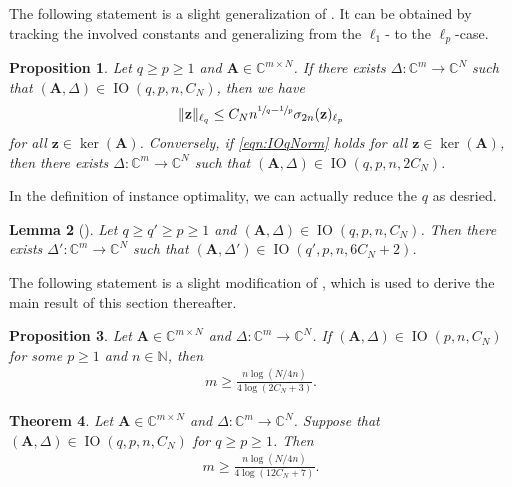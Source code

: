 \documentclass[11pt,reqno, a4paper]{article}
\numberwithin{equation}{section}
\newtheorem{theorem}{Theorem}[section]
\newtheorem{lemma}[theorem]{Lemma}
\newtheorem{prop}[theorem]{Proposition}
\newcommand{\N}{\mathbb{N}}
\newcommand{\C}{\mathbb{C}}
\begin{document}
The following statement is a slight generalization of \cite[Thm.\ 11.4]{FoRa13}.
It can be obtained by tracking the involved constants and generalizing from the $\ell_1$- to the $\ell_p$-case.

\begin{prop}\label{prop:IO_to_best_n_term}
Let $q\geq p\geq 1$ and $\mathbf{A}\in\C^{m\times N}$.
If there exists $\Delta\colon \C^m \to\C^N$ such that $(\mathbf{A},\Delta)\in\operatorname{IO}(q,p,n,C_N)$, then we have
\begin{gather}\label{eqn:IOqNorm}
\lVert\mathbf{z}\rVert_{\ell_q}\leq C_Nn^{\sfrac{1}{q}-\sfrac{1}{p}}\sigma_{2n}(\mathbf{z})_{\ell_p}
\end{gather}
for all $\mathbf{z}\in\ker(\mathbf{A})$. Conversely, if \eqref{eqn:IOqNorm} holds for all $\mathbf{z}\in\ker(\mathbf{A})$, then there exists $\Delta\colon \C^m \to\C^N$ such that $(\mathbf{A},\Delta) \in \operatorname{IO}(q,p,n,2C_N)$.
\end{prop}
In the definition of instance optimality, we can actually reduce the $q$ as desried. 
\begin{lemma}[{\cite[Thm.\ 11.8]{FoRa13}}] \label{thm:IOPreservation}
Let $q\geq q'\geq p\geq 1$ and $(\mathbf{A},\Delta)\in\operatorname{IO}(q,p,n,C_N)$.
Then there exists $\Delta'\colon \C^m \to\C^N$ such that $(\mathbf{A},\Delta')\in\operatorname{IO}(q',p,n,6C_N+2)$.
\end{lemma}

The following statement is a slight modification of \cite[Thm.\ 11.6]{FoRa13}, which is used to derive the main result of this section thereafter.

\begin{prop}\label{thm:LowerBoundSingleNorm}
Let $\mathbf{A}\in\C^{m\times N}$ and $\Delta\colon \C^m \to\C^N$.
If $(\mathbf{A},\Delta) \in\operatorname{IO}(p,n,C_N)$ for some $p\geq 1$ and $n \in \N$, then
\begin{gather}
m\geq \frac{n\log(N/4n)}{4\log(2C_N+3)}.
\end{gather}
\end{prop}

\begin{theorem}\label{instance_vector}
Let $\mathbf{A}\in\C^{m\times N}$ and $\Delta\colon \C^m \to\C^N$. Suppose that $(\mathbf{A},\Delta)\in\operatorname{IO}(q,p,n,C_N)$ for $q\geq p\geq 1$. Then
\begin{gather}
    m\geq\frac{n\log(N/4n)}{4\log(12C_N+7)}.
\end{gather}
\end{theorem}
\end{document}

